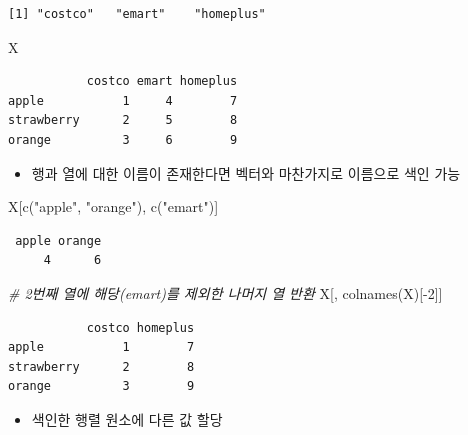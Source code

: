 \documentclass[
  11pt,
]{krantz}
\newenvironment{Shaded}{\begin{snugshade}}{\end{snugshade}}
\newcommand{\CommentTok}[1]{\textcolor[rgb]{0.37,0.37,0.37}{\textit{#1}}}
\newcommand{\DecValTok}[1]{\textcolor[rgb]{0.06,0.06,0.06}{#1}}
\newcommand{\FunctionTok}[1]{\textcolor[rgb]{0,0,0}{#1}}
\newcommand{\NormalTok}[1]{#1}
\newcommand{\SpecialCharTok}[1]{\textcolor[rgb]{0,0,0}{#1}}
\newcommand{\StringTok}[1]{\textcolor[rgb]{0.5,0.5,0.5}{#1}}
\providecommand{\tightlist}{%
  \setlength{\itemsep}{0pt}\setlength{\parskip}{0pt}}
\begin{document}
\begin{verbatim}
[1] "costco"   "emart"    "homeplus"
\end{verbatim}

\begin{Shaded}
\begin{Highlighting}[]
\NormalTok{X}
\end{Highlighting}
\end{Shaded}

\begin{verbatim}
           costco emart homeplus
apple           1     4        7
strawberry      2     5        8
orange          3     6        9
\end{verbatim}

\normalsize

\begin{itemize}
\tightlist
\item
  행과 열에 대한 이름이 존재한다면 벡터와 마찬가지로 이름으로 색인 가능
\end{itemize}

\footnotesize

\begin{Shaded}
\begin{Highlighting}[]
\NormalTok{X[}\FunctionTok{c}\NormalTok{(}\StringTok{"apple"}\NormalTok{, }\StringTok{"orange"}\NormalTok{), }\FunctionTok{c}\NormalTok{(}\StringTok{"emart"}\NormalTok{)]}
\end{Highlighting}
\end{Shaded}

\begin{verbatim}
 apple orange 
     4      6 
\end{verbatim}

\begin{Shaded}
\begin{Highlighting}[]
\CommentTok{\# 2번째 열에 해당(emart)를 제외한 나머지 열 반환}
\NormalTok{X[, }\FunctionTok{colnames}\NormalTok{(X)[}\SpecialCharTok{{-}}\DecValTok{2}\NormalTok{]]}
\end{Highlighting}
\end{Shaded}

\begin{verbatim}
           costco homeplus
apple           1        7
strawberry      2        8
orange          3        9
\end{verbatim}

\normalsize

\begin{itemize}
\tightlist
\item
  색인한 행렬 원소에 다른 값 할당
\end{itemize}
\end{document}
